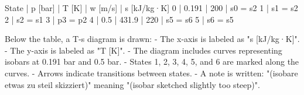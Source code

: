 State | p [bar] | T [K] | w [m/s] | s [kJ/kg·K]  
0 | 0.191 | 200 | s0 = s2  
1 | s1 = s2  
2 | s2 = s1  
3 | p3 = p2  
4 | 0.5 | 431.9 | 220 | s5 = s6  
5 | s6 = s5  

Below the table, a T-s diagram is drawn:  
- The x-axis is labeled as "s [kJ/kg·K]".  
- The y-axis is labeled as "T [K]".  
- The diagram includes curves representing isobars at 0.191 bar and 0.5 bar.  
- States 1, 2, 3, 4, 5, and 6 are marked along the curves.  
- Arrows indicate transitions between states.  
- A note is written: "(isobare etwas zu steil skizziert)" meaning "(isobar sketched slightly too steep)".